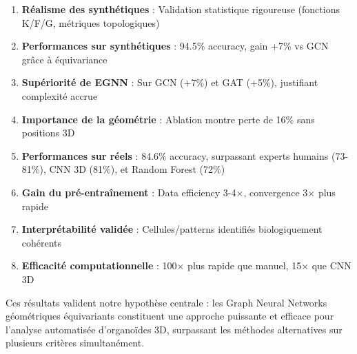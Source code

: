 \begin{enumerate}
    \item \textbf{Réalisme des synthétiques} : Validation statistique rigoureuse (fonctions K/F/G, métriques topologiques)
    
    \item \textbf{Performances sur synthétiques} : 94.5\% accuracy, gain +7\% vs GCN grâce à équivariance
    
    \item \textbf{Supériorité de EGNN} : Sur GCN (+7\%) et GAT (+5\%), justifiant complexité accrue
    
    \item \textbf{Importance de la géométrie} : Ablation montre perte de 16\% sans positions 3D
    
    \item \textbf{Performances sur réels} : 84.6\% accuracy, surpassant experts humains (73-81\%), CNN 3D (81\%), et Random Forest (72\%)
    
    \item \textbf{Gain du pré-entraînement} : Data efficiency 3-4×, convergence 3× plus rapide
    
    \item \textbf{Interprétabilité validée} : Cellules/patterns identifiés biologiquement cohérents
    
    \item \textbf{Efficacité computationnelle} : 100× plus rapide que manuel, 15× que CNN 3D
\end{enumerate}

Ces résultats valident notre hypothèse centrale : les Graph Neural Networks géométriques équivariants constituent une approche puissante et efficace pour l'analyse automatisée d'organoïdes 3D, surpassant les méthodes alternatives sur plusieurs critères simultanément.

